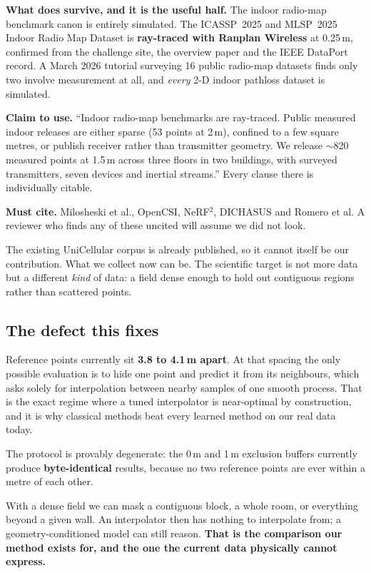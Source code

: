 \documentclass[11pt,a4paper]{article}
\newcommand{\B}[1]{\textcolor{bad}{\textbf{#1}}}
\newcommand{\G}[1]{\textcolor{good}{\textbf{#1}}}
\begin{document}
\textbf{What does survive, and it is the useful half.} The indoor radio-map benchmark
canon is entirely simulated. The ICASSP~2025 and MLSP~2025 Indoor Radio Map Dataset is
\G{ray-traced with Ranplan Wireless} at 0.25\,m, confirmed from the challenge site, the
overview paper and the IEEE DataPort record. A March 2026 tutorial surveying 16 public
radio-map datasets finds only two involve measurement at all, and \emph{every} 2-D indoor
pathloss dataset is simulated.

\textbf{Claim to use.} ``Indoor radio-map benchmarks are ray-traced. Public measured
indoor releases are either sparse (53 points at 2\,m), confined to a few square metres,
or publish receiver rather than transmitter geometry. We release $\sim$820 measured
points at 1.5\,m across three floors in two buildings, with surveyed transmitters, seven
devices and inertial streams.'' Every clause there is individually citable.

\textbf{Must cite.} Milosheski et al., OpenCSI, NeRF$^2$, DICHASUS and Romero et al. A
reviewer who finds any of these uncited will assume we did not look.

The existing UniCellular corpus is already published, so it cannot itself be our
contribution. What we collect now can be. The scientific target is not more data but a
different \emph{kind} of data: a field dense enough to hold out contiguous regions
rather than scattered points.

\subsection{The defect this fixes}

Reference points currently sit \textbf{3.8 to 4.1\,m apart}. At that spacing the only
possible evaluation is to hide one point and predict it from its neighbours, which asks
solely for interpolation between nearby samples of one smooth process. That is the exact
regime where a tuned interpolator is near-optimal by construction, and it is why
classical methods beat every learned method on our real data today.

The protocol is provably degenerate: the 0\,m and 1\,m exclusion buffers currently
produce \B{byte-identical} results, because no two reference points are ever within a
metre of each other.

With a dense field we can mask a contiguous block, a whole room, or everything beyond a
given wall. An interpolator then has nothing to interpolate from; a geometry-conditioned
model can still reason. \textbf{That is the comparison our method exists for, and the one
the current data physically cannot express.}
\end{document}
